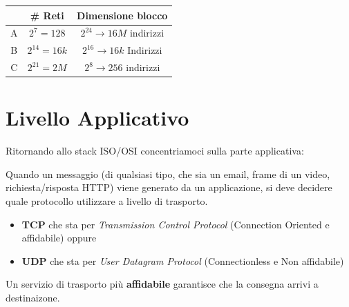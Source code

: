 \documentclass[a4paper]{article}
\begin{document}
\begin{table}[H]
\centering
\begin{tabular}{|c|c|c|}
    \hline
    & \# Reti & Dimensione blocco\\
    \hline
    A & $2^7 = 128$ & $2^{24} \rightarrow 16M$ indirizzi\\
    \hline 
    B & $2^{14} = 16k$ & $2^{16} \rightarrow 16k$ Indirizzi\\
    \hline
    C & $2^{21} = 2M$ & $2^8 \rightarrow 256$ indirizzi\\
    \hline
\end{tabular}
\end{table}

\pagebreak

\section{Livello Applicativo}

Ritornando allo stack ISO/OSI concentriamoci sulla parte applicativa:
    \begin{figure}[H]
      \centering
    \end{figure}
Quando un messaggio (di qualsiasi tipo, che sia un email, frame di un video, richiesta/risposta HTTP) viene generato da un applicazione, si deve decidere quale protocollo utilizzare a livello di trasporto. \begin{itemize} \item 
\textbf{TCP} che sta per \textit{Transmission Control Protocol} (Connection Oriented e affidabile) oppure \item \textbf{UDP} che sta per\textit{ User Datagram Protocol } (Connectionless e Non affidabile)
\end{itemize}
Un servizio di trasporto più \textbf{affidabile} garantisce che la consegna arrivi a destinaizone.
\end{document}
